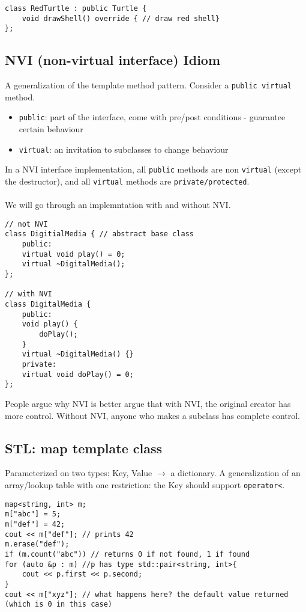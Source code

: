 \documentclass[12pt]{article}
\begin{document}
\begin{lstlisting}
class RedTurtle : public Turtle {
    void drawShell() override { // draw red shell}
};
\end{lstlisting}

\subsection{NVI (non-virtual interface) Idiom}

A generalization of the template method pattern. Consider a \lstinline{public virtual} method.
\begin{itemize}
    \item \lstinline{public}: part of the interface, come with pre/post conditions - guarantee certain behaviour
    \item \lstinline{virtual}: an invitation to subclasses to change behaviour
\end{itemize}

In a NVI interface implementation, all \lstinline{public} methods are non \lstinline{virtual} (except the destructor), and all \lstinline{virtual} methods are \lstinline{private/protected}.\\\\ We will go through an implemntation with and without NVI.

\begin{lstlisting}
// not NVI
class DigitialMedia { // abstract base class
    public:
    virtual void play() = 0;
    virtual ~DigitalMedia();
};

// with NVI
class DigitalMedia {
    public:
    void play() {
        doPlay();
    }
    virtual ~DigitalMedia() {}
    private:
    virtual void doPlay() = 0;
};
\end{lstlisting}

People argue why NVI is better argue that with NVI, the original creator has more control. Without NVI, anyone who makes a subclass has complete control.

\subsection{STL: map template class}
Parameterized on two types: Key, Value $\to$ a dictionary. A generalization of an array/lookup table with one restriction: the Key should support \lstinline{operator<}.
\begin{lstlisting}
map<string, int> m;
m["abc"] = 5;
m["def"] = 42;
cout << m["def"]; // prints 42
m.erase("def");
if (m.count("abc")) // returns 0 if not found, 1 if found
for (auto &p : m) //p has type std::pair<string, int>{
    cout << p.first << p.second;
}
cout << m["xyz"]; // what happens here? the default value returned (which is 0 in this case)
\end{lstlisting}
\end{document}
